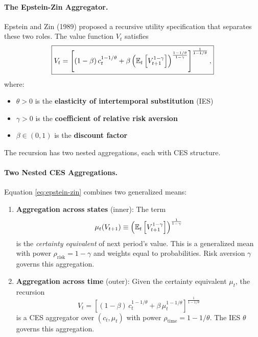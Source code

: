 \paragraph{The Epstein-Zin Aggregator.}

Epstein and Zin (1989) proposed a recursive utility specification that separates these two roles. The value function $V_t$ satisfies
\begin{equation}
\boxed{V_t = \left[ (1-\beta) \, c_t^{1-1/\theta} + \beta \left( \mathbb{E}_t\left[ V_{t+1}^{1-\gamma} \right] \right)^{\frac{1-1/\theta}{1-\gamma}} \right]^{\frac{1}{1-1/\theta}},}
\label{eq:epstein-zin}
\end{equation}
where:
\begin{itemize}[nosep]
    \item $\theta > 0$ is the \textbf{elasticity of intertemporal substitution} (IES)
    \item $\gamma > 0$ is the \textbf{coefficient of relative risk aversion}
    \item $\beta \in (0,1)$ is the \textbf{discount factor}
\end{itemize}

The recursion has two nested aggregations, each with CES structure.

\paragraph{Two Nested CES Aggregations.}

Equation \eqref{eq:epstein-zin} combines two generalized means:

\begin{enumerate}[label=(\roman*)]
    \item \textbf{Aggregation across states} (inner): The term
    \begin{equation}
    \mu_t(V_{t+1}) \equiv \left( \mathbb{E}_t\left[ V_{t+1}^{1-\gamma} \right] \right)^{\frac{1}{1-\gamma}}
    \label{eq:certainty-equivalent-v}
    \end{equation}
    is the \emph{certainty equivalent} of next period's value. This is a generalized mean with power $\rho_{\text{risk}} = 1 - \gamma$ and weights equal to probabilities. Risk aversion $\gamma$ governs this aggregation.
    
    \item \textbf{Aggregation across time} (outer): Given the certainty equivalent $\mu_t$, the recursion
    \begin{equation}
    V_t = \left[ (1-\beta) \, c_t^{1-1/\theta} + \beta \, \mu_t^{1-1/\theta} \right]^{\frac{1}{1-1/\theta}}
    \label{eq:intertemporal-aggregation}
    \end{equation}
    is a CES aggregator over $(c_t, \mu_t)$ with power $\rho_{\text{time}} = 1 - 1/\theta$. The IES $\theta$ governs this aggregation.
\end{enumerate}

